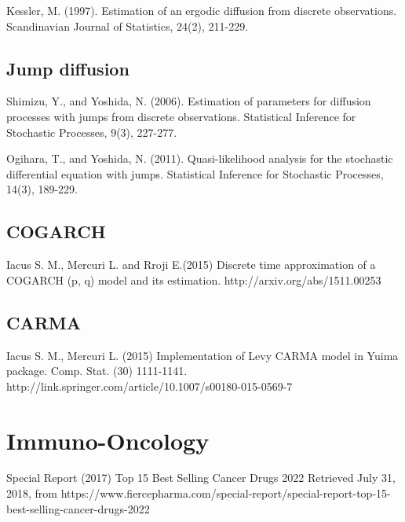 \begin{thebibliography}{00}
Kessler, M. (1997). 
\newblock Estimation of an ergodic diffusion from discrete observations. 
\newblock Scandinavian Journal of Statistics, 24(2), 211-229.

\subsection{Jump diffusion}

Shimizu, Y., and Yoshida, N. (2006). 
\newblock Estimation of parameters for diffusion processes with jumps from discrete observations. 
\newblock Statistical Inference for Stochastic Processes, 9(3), 227-277.

Ogihara, T., and Yoshida, N. (2011). 
\newblock Quasi-likelihood analysis for the stochastic differential equation with jumps. 
\newblock Statistical Inference for Stochastic Processes, 14(3), 189-229.

\subsection{COGARCH}

Iacus S. M., Mercuri L. and Rroji E.(2015) 
\newblock Discrete time approximation of a COGARCH (p, q) model and its estimation. 
\newblock http://arxiv.org/abs/1511.00253

\subsection{CARMA}

Iacus S. M., Mercuri L. (2015) 
\newblock Implementation of Levy CARMA model in Yuima package. Comp. Stat. (30) 1111-1141. 
\newblock http://link.springer.com/article/10.1007/s00180-015-0569-7
\section{Immuno-Oncology}

Special Report (2017)
\newblock Top 15 Best Selling Cancer Drugs 2022
\newblock Retrieved July 31, 2018, from https://www.fiercepharma.com/special-report/special-report-top-15-best-selling-cancer-drugs-2022


\end{thebibliography}
